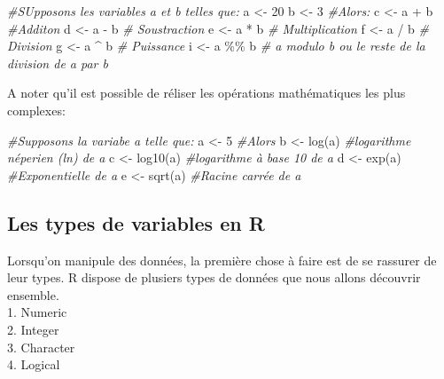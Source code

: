 \documentclass[
]{article}
\newenvironment{Shaded}{\begin{snugshade}}{\end{snugshade}}
\newcommand{\CommentTok}[1]{\textcolor[rgb]{0.56,0.35,0.01}{\textit{#1}}}
\newcommand{\DecValTok}[1]{\textcolor[rgb]{0.00,0.00,0.81}{#1}}
\newcommand{\FunctionTok}[1]{\textcolor[rgb]{0.00,0.00,0.00}{#1}}
\newcommand{\NormalTok}[1]{#1}
\newcommand{\OtherTok}[1]{\textcolor[rgb]{0.56,0.35,0.01}{#1}}
\newcommand{\SpecialCharTok}[1]{\textcolor[rgb]{0.00,0.00,0.00}{#1}}
\begin{document}
\begin{Shaded}
\begin{Highlighting}[]
\CommentTok{\#SUpposons les variables a et b telles que:}
\NormalTok{a }\OtherTok{\textless{}{-}} \DecValTok{20}
\NormalTok{b }\OtherTok{\textless{}{-}} \DecValTok{3}
\CommentTok{\#Alors:}
\NormalTok{c }\OtherTok{\textless{}{-}}\NormalTok{ a }\SpecialCharTok{+}\NormalTok{ b   }\CommentTok{\#Additon}
\NormalTok{d }\OtherTok{\textless{}{-}}\NormalTok{ a }\SpecialCharTok{{-}}\NormalTok{ b   }\CommentTok{\# Soustraction}
\NormalTok{e }\OtherTok{\textless{}{-}}\NormalTok{ a }\SpecialCharTok{*}\NormalTok{ b   }\CommentTok{\# Multiplication}
\NormalTok{f }\OtherTok{\textless{}{-}}\NormalTok{ a }\SpecialCharTok{/}\NormalTok{ b   }\CommentTok{\# Division}
\NormalTok{g }\OtherTok{\textless{}{-}}\NormalTok{ a }\SpecialCharTok{\^{}}\NormalTok{ b   }\CommentTok{\# Puissance}
\NormalTok{i }\OtherTok{\textless{}{-}}\NormalTok{ a }\SpecialCharTok{\%\%}\NormalTok{ b }\CommentTok{\# a modulo b ou le reste de la division de a par b}
\end{Highlighting}
\end{Shaded}

A noter qu'il est possible de réliser les opérations mathématiques les
plus complexes:

\begin{Shaded}
\begin{Highlighting}[]
\CommentTok{\#Supposons la variabe a telle que:}
\NormalTok{a }\OtherTok{\textless{}{-}} \DecValTok{5}
\CommentTok{\#Alors}
\NormalTok{b }\OtherTok{\textless{}{-}} \FunctionTok{log}\NormalTok{(a)   }\CommentTok{\#logarithme néperien (ln) de a }
\NormalTok{c }\OtherTok{\textless{}{-}} \FunctionTok{log10}\NormalTok{(a) }\CommentTok{\#logarithme à base 10 de a }
\NormalTok{d }\OtherTok{\textless{}{-}} \FunctionTok{exp}\NormalTok{(a)   }\CommentTok{\#Exponentielle de a}
\NormalTok{e }\OtherTok{\textless{}{-}} \FunctionTok{sqrt}\NormalTok{(a)  }\CommentTok{\#Racine carrée de a}
\end{Highlighting}
\end{Shaded}

\hypertarget{les-types-de-variables-en-r}{%
\subsection{Les types de variables en
R}\label{les-types-de-variables-en-r}}

Lorsqu'on manipule des données, la première chose à faire est de se
rassurer de leur types. R dispose de plusiers types de données que nous
allons découvrir ensemble.\\
1. Numeric\\
2. Integer\\
3. Character\\
4. Logical
\end{document}
